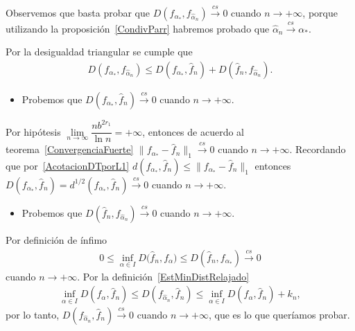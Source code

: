 \begin{dem}
	
	Observemos que basta probar que $D(f_{\alpha_{*}},f_{\widehat{\alpha}_n}) \stackrel{cs}{\longrightarrow} 0$ cuando $n \rightarrow +\infty$, porque utilizando la proposición~\ref{CondivParr} habremos probado que $\widehat{\alpha}_n \stackrel{cs}{\longrightarrow} \alpha_{*}.$
	
    Por la desigualdad triangular se cumple que
	\begin{align}
	D(f_{\alpha_{*}},f_{\widehat{\alpha}_n}) \leq D(f_{\alpha_{*}},\widehat{f}_n)+D(\widehat{f}_n,f_{\widehat{\alpha}_n}).
	\end{align}
\begin{itemize}
	\item Probemos que $D(f_{\alpha_{*}},\widehat{f}_n) \stackrel{cs}{\longrightarrow} 0$ cuando $n \to +\infty$.
\end{itemize}
	
	Por hipótesis $\lim\limits_{n \to \infty} \dfrac{n b^{2r_1}}{\ln{n}}  = +\infty $, entonces de acuerdo al teorema~\ref{ConvergenciaFuerte} $\| f_{\alpha_{*}} -\widehat{f}_n\|_1 \stackrel{cs}{\longrightarrow} 0$ cuando $n \to +\infty$. Recordando que por~\eqref{AcotacionDTporL1} $d(f_{\alpha_{*}},\widehat{f}_n) \leq \| f_{\alpha_{*}} -\widehat{f}_n\|_1$ entonces $D(f_{\alpha_{*}},\widehat{f}_n)=d^{1/2}(f_{\alpha_{*}},\widehat{f}_n) \stackrel{cs}{\longrightarrow} 0$ cuando $n \to +\infty$. 

\begin{itemize}
	\item Probemos que $D(\widehat{f}_n,f_{\widehat{\alpha}_n}) \stackrel{cs}{\longrightarrow} 0$ cuando $n \to +\infty$.
\end{itemize}

Por definición de ínfimo %
\begin{align*}
0 \leq \inf_{\alpha\in I} D{(\widehat{f}_{n},f_{\alpha}}) \leq  D(\widehat{f}_{n},f_{\alpha_{*}})\stackrel{cs}{\longrightarrow} 0
\end{align*}
cuando $n\to +\infty$.
Por la definición~\ref{EstMinDistRelajado}
\begin{align}
\label{EstMinDistRelajado2}
\inf\limits_{\alpha \in I}D(f_{{\alpha}},\widehat{f}_n) \leq D(f_{\widehat{\alpha}_{n}},\widehat{f}_n) \leq \inf\limits_{\alpha \in I}D(f_{{\alpha}},\widehat{f}_n) + k_n,
\end{align}
por lo tanto, $D(f_{\widehat{\alpha}_{n}},\widehat{f}_n) \stackrel{cs}{\longrightarrow} 0$ cuando $n \to +\infty$, que es lo que queríamos probar.
\end{dem}

